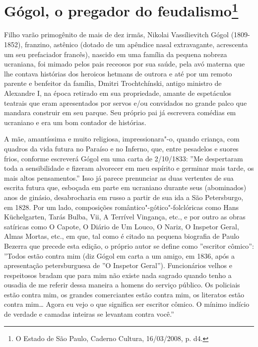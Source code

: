\chapter{Gógol, o pregador do feudalismo\footnote{O Estado de São Paulo,
  Caderno Cultura, 16/03/2008, p. d4.}}

Filho varão primogênito de mais de dez irmãs, Nikolai Vassílievitch
Gógol (1809-1852), franzino, astênico (dotado de um apêndice nasal
extravagante, acrescenta um seu prefaciador francês), nascido em uma
família da pequena nobreza ucraniana, foi mimado pelos pais receosos por
sua saúde, pela avó materna que lhe contava histórias dos heroicos
hetmans de outrora e até por um remoto parente e benfeitor da família,
Dmitri Trochtchínski, antigo ministro de Alexandre I, na época retirado
em sua propriedade, amante de espetáculos teatrais que eram apresentados
por servos e/ou convidados no grande palco que mandara construir em seu
parque. Seu próprio pai já escrevera comédias em ucraniano e era um bom
contador de histórias.

A mãe, amantíssima e muito religiosa, impressionara"-o, quando criança,
com quadros da vida futura no Paraíso e no Inferno, que, entre pesadelos
e suores frios, conforme escreverá Gógol em uma carta de 2/10/1833: ''Me
despertaram toda a sensibilidade e fizeram alvorecer em meu espírito e
germinar mais tarde, os mais altos pensamentos.'' Isso já parece
prenunciar as duas vertentes de sua escrita futura que, esboçada em
parte em ucraniano durante seus (abominados) anos de ginásio,
desabrocharia em russo a partir de sua ida a São Petersburgo, em 1828.
Por um lado, composições romântico"-gótico"-folclóricas como Hans
Küchelgarten, Tarás Bulba, Vii, A Terrível Vingança, etc., e por outro
as obras satíricas como O Capote, O Diário de Um Louco, O Nariz, O
Inspetor Geral, Almas Mortas, etc., em que, tal como é citado na pequena
biografia de Paulo Bezerra que precede esta edição, o próprio autor se
define como ''escritor cômico'': ''Todos estão contra mim (diz Gógol em
carta a um amigo, em 1836, após a apresentação petersburguesa de ''O
Inspetor Geral''). Funcionários velhos e respeitosos bradam que para mim
não existe nada sagrado quando tenho a ousadia de me referir dessa
maneira a homens do serviço público. Os policiais estão contra mim, os
grandes comerciantes estão contra mim, os literatos estão contra mim\ldots{}
Agora eu vejo o que significa ser escritor cômico. O mínimo indício de
verdade e camadas inteiras se levantam contra você.''

